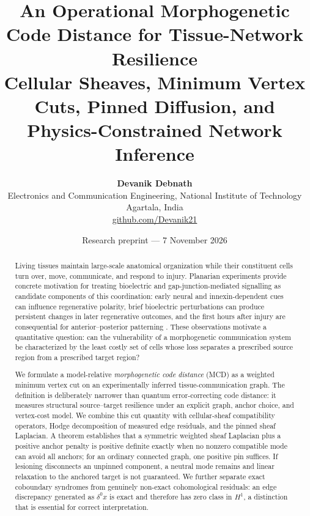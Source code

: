 \documentclass[12pt,a4paper]{article}
\title{\vspace{-1.4cm}\textbf{An Operational Morphogenetic Code Distance for Tissue-Network Resilience}\\[0.55em]
\large Cellular Sheaves, Minimum Vertex Cuts, Pinned Diffusion, and Physics-Constrained Network Inference}
\author{\textbf{Devanik Debnath}\\
Electronics and Communication Engineering, National Institute of Technology Agartala, India\\
\href{https://github.com/Devanik21}{github.com/Devanik21}}
\date{Research preprint --- 7 November 2026}
\begin{document}
\maketitle
\begin{abstract}
Living tissues maintain large-scale anatomical organization while their constituent cells turn over, move, communicate, and respond to injury. Planarian experiments provide concrete motivation for treating bioelectric and gap-junction-mediated signalling as candidate components of this coordination: early neural and innexin-dependent cues can influence regenerative polarity, brief bioelectric perturbations can produce persistent changes in later regenerative outcomes, and the first hours after injury are consequential for anterior--posterior patterning \citep{Oviedo2010,Durant2017,Durant2019}. These observations motivate a quantitative question: can the vulnerability of a morphogenetic communication system be characterized by the least costly set of cells whose loss separates a prescribed source region from a prescribed target region?

We formulate a model-relative \emph{morphogenetic code distance} (MCD) as a weighted minimum vertex cut on an experimentally inferred tissue-communication graph. The definition is deliberately narrower than quantum error-correcting code distance: it measures structural source--target resilience under an explicit graph, anchor choice, and vertex-cost model. We combine this cut quantity with cellular-sheaf compatibility operators, Hodge decomposition of measured edge residuals, and the pinned sheaf Laplacian. A theorem establishes that a symmetric weighted sheaf Laplacian plus a positive anchor penalty is positive definite exactly when no nonzero compatible mode can avoid all anchors; for an ordinary connected graph, one positive pin suffices. If lesioning disconnects an unpinned component, a neutral mode remains and linear relaxation to the anchored target is not guaranteed. We further separate exact coboundary syndromes from genuinely non-exact cohomological residuals: an edge discrepancy generated as \(\delta^0 x\) is exact and therefore has zero class in \(H^1\), a distinction that is essential for correct interpretation.


\end{abstract}
\end{document}
